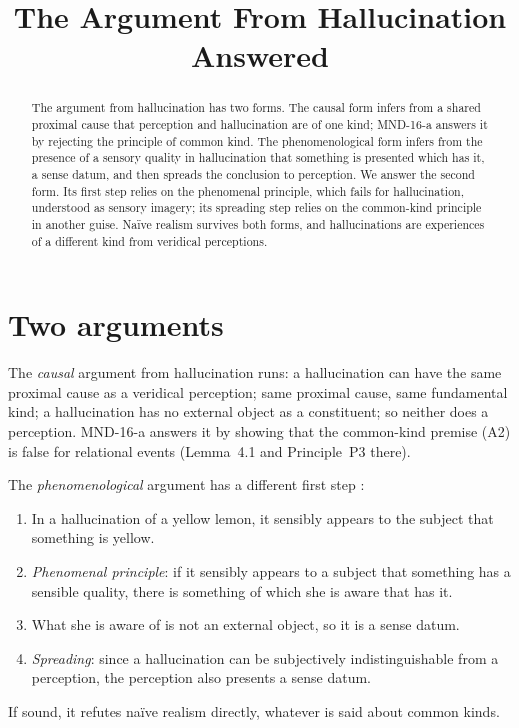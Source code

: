 \documentclass{situationist-preprint}
\title{The Argument From Hallucination Answered}
\begin{document}
\maketitle

\begin{abstract}
The argument from hallucination has two forms. The causal form infers from a shared proximal cause that perception and hallucination are of one kind; MND-16-a answers it by rejecting the principle of common kind. The phenomenological form infers from the presence of a sensory quality in hallucination that something is presented which has it, a sense datum, and then spreads the conclusion to perception. We answer the second form. Its first step relies on the phenomenal principle, which fails for hallucination, understood as sensory imagery; its spreading step relies on the common-kind principle in another guise. Naïve realism survives both forms, and hallucinations are experiences of a different kind from veridical perceptions.
\end{abstract}

\section{Two arguments}

The \emph{causal} argument from hallucination runs: a hallucination can have the same proximal cause as a veridical perception; same proximal cause, same fundamental kind; a hallucination has no external object as a constituent; so neither does a perception. MND-16-a answers it by showing that the common-kind premise (A2) is false for relational events (Lemma~4.1 and Principle~P3 there).

The \emph{phenomenological} argument has a different first step \citep{Ayer1940,Robinson1994}:
\begin{enumerate}
\item[(H1)] In a hallucination of a yellow lemon, it sensibly appears to the subject that something is yellow.
\item[(H2)] \emph{Phenomenal principle}: if it sensibly appears to a subject that something has a sensible quality, there is something of which she is aware that has it.
\item[(H3)] What she is aware of is not an external object, so it is a sense datum.
\item[(H4)] \emph{Spreading}: since a hallucination can be subjectively indistinguishable from a perception, the perception also presents a sense datum.
\end{enumerate}
If sound, it refutes naïve realism directly, whatever is said about common kinds.
\end{document}
